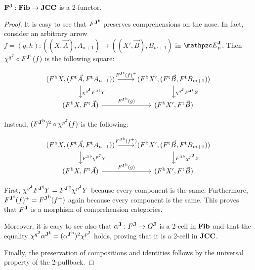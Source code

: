 \documentclass{lmcs} %
\theoremstyle{plain}\newtheorem{satz}[thm]{Satz} %
\begin{document}
			\begin{lem}\label{lem:J2fun}
				$\mathbf{F^J}:\mathbf{Fib}\to\mathbf{JCC}$ is a 2-functor.
			\end{lem}
			
			\begin{proof}
				It is easy to see that ${{F}^{\mathbf{J}}}^{\mathrm{t}}$ preserves comprehensions on the nose.
				In fact, consider an arbitrary arrow $f=(g,h):((X,\vec{A}), A_{n+1})\rightarrow ((X',\vec{B}), B_{m+1})$ in $\JDomE{p}$. Then $\chi^{{q}^{\mathbf{J}}}\circ {\ensuremath{{F}^{\mathbf{J}}}}^{\mathrm{t}}(f)$ is the following square:
				
				\[\begin{tikzcd}
					{(\fb{F}X,(\ft{F}\vec{A}, \ft{F}A_{n+1}))} & {(\fb{F}X',(\ft{F}\vec{B}, \ft{F}B_{m+1}))} \\
					{(\fb{F}X,\ft{F}\vec{A})} & {(\fb{F}X',\ft{F}\vec{B})}
					\arrow["\carr{\ft{\JFun{F}}(f)}", from=1-1, to=1-2]
					\arrow["\JFC{q} \ft{\JFun{F}}Y", from=1-1, to=2-1]
					\arrow["\JFC{q} \ft{\JFun{F}}Z", from=1-2, to=2-2]
					\arrow["\fb{\JFun{F}}(g)", from=2-1, to=2-2]
				\end{tikzcd}\]
				
				Instead, $({{F}^{\mathbf{J}}}^{\mathrm{b}})^{2}\circ \chi^{{p}^{\mathbf{J}}} (f)$ is the following:
				
				\[\begin{tikzcd}
					{(\fb{F}X,(\ft{F}\vec{A}, \ft{F}A_{n+1}))} & {(\fb{F}X',(\ft{F}\vec{B}, \ft{F}B_{m+1}))} \\
					{(\fb{F}X,\ft{F}\vec{A})} & {(\fb{F}X',\ft{F}\vec{B})}
					\arrow["\fb{\JFun{F}}(\carr{f})", from=1-1, to=1-2]
					\arrow["\fb{\JFun{F}}\JFC{p} Y", from=1-1, to=2-1]
					\arrow["\fb{\JFun{F}}\JFC{p} Z", from=1-2, to=2-2]
					\arrow["\fb{\JFun{F}}(g)", from=2-1, to=2-2]
				\end{tikzcd}\]
				
				First, $\chi^{{q}^{\mathbf{J}}} {{F}^{\mathbf{J}}}^{\mathrm{t}}Y={{F}^{\mathbf{J}}}^{\mathrm{b}}\chi^{{p}^{\mathbf{J}}} Y$ because every component is the same. Furthermore, ${{F}^{\mathbf{J}}}^{\mathrm{t}}(f)^+={{F}^{\mathbf{J}}}^{\mathrm{b}}(f^+)$ again because every component is the same. This proves that ${F}^{\mathbf{J}}$ is a morphism of comprehension categories.
				
				Moreover, it is easy to see also that ${\alpha}^{\mathbf{J}}:{F}^{\mathbf{J}}\to{G}^{\mathbf{J}}$ is a 2-cell in $\mathbf{Fib}$ and that the equality $\chi^{{q}^{\mathbf{J}}}{{\alpha}^{\mathbf{J}}}^{\mathrm{t}}=({{\alpha}^{\mathbf{J}}}^{\mathrm{b}})^{2}\chi^{{p}^{\mathbf{J}}}$ holds, proving that it is a 2-cell in $\mathbf{JCC}$.
				
				Finally, the preservation of compositions and identities follows by the universal property of the 2-pullback.
			\end{proof}
			
\end{document}
